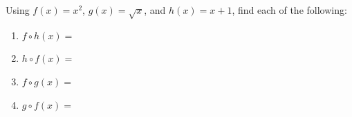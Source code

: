 \begin{practiceprob}
    Using \(f(x)=x^2\), \(g(x)=\sqrt{x}\), and \(h(x)=x+1\), find each of the following:
    \begin{enumerate}
        \item \(f\circ h(x)=\)\vspace{4\baselineskip}
        \item \(h\circ f(x)=\)\vspace{4\baselineskip}
        \item \(f\circ g(x)=\)\vspace{4\baselineskip}
        \item \(g\circ f(x)=\)\vspace{4\baselineskip}
    \end{enumerate}
\end{practiceprob}